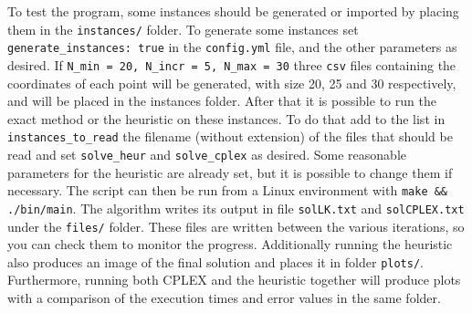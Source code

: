 To test the program, some instances should be generated or imported by placing them in the \texttt{instances/} folder. To generate some instances set \texttt{generate\_instances: true} in the \texttt{config.yml} file, and the other parameters as desired. If \texttt{N\_min = 20, N\_incr = 5, N\_max = 30} three \texttt{csv} files containing the coordinates of each point will be generated, with size 20, 25 and 30 respectively, and will be placed in the instances folder. After that it is possible to run the exact method or the heuristic on these instances. To do that add to the list in \texttt{instances\_to\_read} the filename (without extension) of the files that should be read and set \texttt{solve\_heur} and \texttt{solve\_cplex} as desired. Some reasonable parameters for the heuristic are already set, but it is possible to change them if necessary. The script can then be run from a Linux environment with \texttt{make \&\& ./bin/main}. The algorithm writes its output in file \texttt{solLK.txt} and \texttt{solCPLEX.txt} under the \texttt{files/} folder. These files are written between the various iterations, so you can check them to monitor the progress. Additionally running the heuristic also produces an image of the final solution and places it in folder \texttt{plots/}. Furthermore, running both CPLEX and the heuristic together will produce plots with a comparison of the execution times and error values in the same folder. \\


